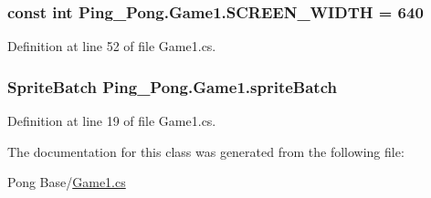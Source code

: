 \hypertarget{class_ping___pong_1_1_game1_ae69f627158d80a56475c055372115b55}{
\subsubsection[{S\-C\-R\-E\-E\-N\-\_\-\-W\-I\-D\-T\-H}]{\setlength{\rightskip}{0pt plus 5cm}const int Ping\-\_\-\-Pong.\-Game1.\-S\-C\-R\-E\-E\-N\-\_\-\-W\-I\-D\-T\-H = 640\hspace{0.3cm}{\ttfamily [private]}}}\label{class_ping___pong_1_1_game1_ae69f627158d80a56475c055372115b55}


Definition at line 52 of file Game1.\-cs.

\hypertarget{class_ping___pong_1_1_game1_a887077461615a43e27f62c978affad96}{
\subsubsection[{sprite\-Batch}]{\setlength{\rightskip}{0pt plus 5cm}Sprite\-Batch Ping\-\_\-\-Pong.\-Game1.\-sprite\-Batch\hspace{0.3cm}{\ttfamily [private]}}}\label{class_ping___pong_1_1_game1_a887077461615a43e27f62c978affad96}


Definition at line 19 of file Game1.\-cs.



The documentation for this class was generated from the following file\-:\begin{DoxyCompactItemize}
\item 
Pong Base/\hyperlink{_game1_8cs}{Game1.\-cs}\end{DoxyCompactItemize}
